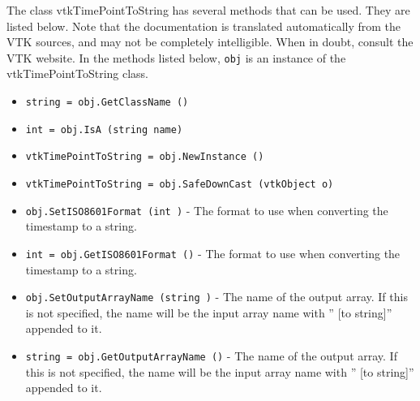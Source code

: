 The class vtkTimePointToString has several methods that can be used.
  They are listed below.
Note that the documentation is translated automatically from the VTK sources,
and may not be completely intelligible.  When in doubt, consult the VTK website.
In the methods listed below, \verb|obj| is an instance of the vtkTimePointToString class.
\begin{itemize}
\item  \verb|string = obj.GetClassName ()|

\item  \verb|int = obj.IsA (string name)|

\item  \verb|vtkTimePointToString = obj.NewInstance ()|

\item  \verb|vtkTimePointToString = obj.SafeDownCast (vtkObject o)|

\item  \verb|obj.SetISO8601Format (int )| -  The format to use when converting the timestamp to a string.

\item  \verb|int = obj.GetISO8601Format ()| -  The format to use when converting the timestamp to a string.

\item  \verb|obj.SetOutputArrayName (string )| -  The name of the output array.
 If this is not specified, the name will be the input array name with
 '' [to string]'' appended to it.

\item  \verb|string = obj.GetOutputArrayName ()| -  The name of the output array.
 If this is not specified, the name will be the input array name with
 '' [to string]'' appended to it.

\end{itemize}
